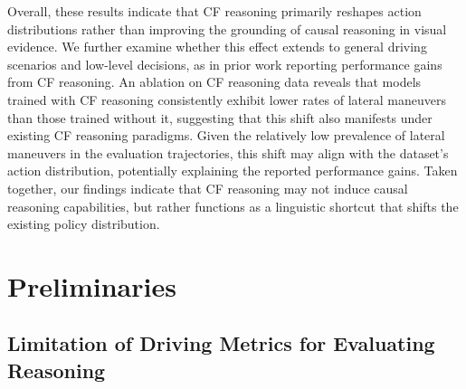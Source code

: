 \documentclass{article}
\begin{document}
Overall, these results indicate that CF reasoning primarily reshapes action distributions rather than improving the grounding of causal reasoning in visual evidence. We further examine whether this effect extends to general driving scenarios and low-level decisions, as in prior work reporting performance gains from CF reasoning\cite{causal:e2e-vlm:omnidrive}. An ablation on CF reasoning data reveals that models trained with CF reasoning consistently exhibit lower rates of lateral maneuvers than those trained without it, suggesting that this shift also manifests under existing CF reasoning paradigms. Given the relatively low prevalence of lateral maneuvers in the evaluation trajectories, this shift may align with the dataset's action distribution, potentially explaining the reported performance gains. Taken together, our findings indicate that CF reasoning may not induce causal reasoning capabilities, but rather functions as a linguistic shortcut that shifts the existing policy distribution.


\section{Preliminaries}
\label{sec:preliminaries}
\subsection{Limitation of Driving Metrics for Evaluating Reasoning}
\end{document}
